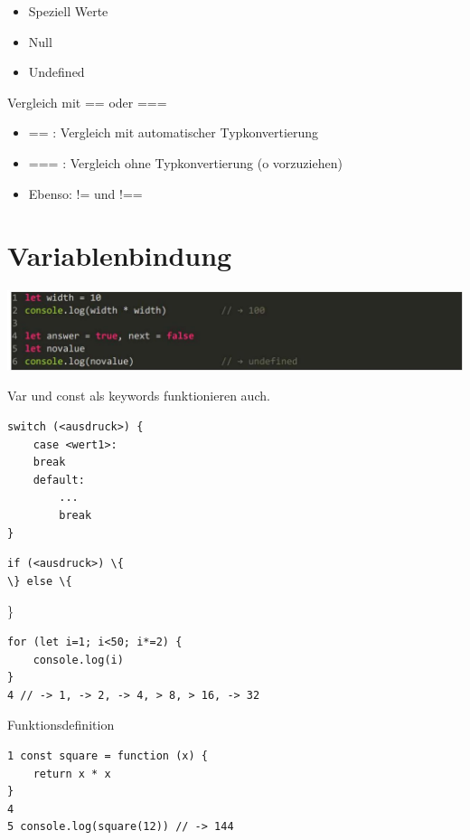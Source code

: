 \documentclass[10pt]{article}
\begin{document}
\begin{itemize}
  \item Speziell Werte
  \item Null
  \item Undefined
\end{itemize}

Vergleich mit == oder ===

\begin{itemize}
  \item == : Vergleich mit automatischer Typkonvertierung
  \item === : Vergleich ohne Typkonvertierung (o vorzuziehen)
  \item Ebenso: != und !==
\end{itemize}

\section*{Variablenbindung}
\begin{center}
\includegraphics[max width=\textwidth]{2024_12_29_858f09cde51177c71657g-05}
\end{center}

Var und const als keywords funktionieren auch.

\begin{verbatim}
switch (<ausdruck>) {
    case <wert1>:
    break
    default:
        ...
        break
}
\end{verbatim}

\begin{verbatim}
if (<ausdruck>) \{
\} else \{
\end{verbatim}

\}

\begin{verbatim}
for (let i=1; i<50; i*=2) {
    console.log(i)
}
4 // -> 1, -> 2, -> 4, > 8, > 16, -> 32
\end{verbatim}

Funktionsdefinition

\begin{verbatim}
1 const square = function (x) {
    return x * x
}
4
5 console.log(square(12)) // -> 144
\end{verbatim}
\end{document}

